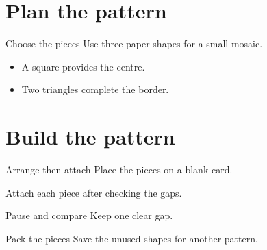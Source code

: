 \section{Plan the pattern}
\begin{frame}{Choose the pieces}
Use three paper shapes for a small mosaic.
\begin{itemize}
  \item A square provides the centre.
  \item Two triangles complete the border.
\end{itemize}
\end{frame}

\section{Build the pattern}
\begin{frame}{Arrange then attach}
Place the pieces on a blank card.

\pause
Attach each piece after checking the gaps.
\end{frame}

\begin{frame}[standout]{Pause and compare}
Keep one clear gap.
\end{frame}

\begin{frame}{Pack the pieces}
Save the unused shapes for another pattern.
\end{frame}
